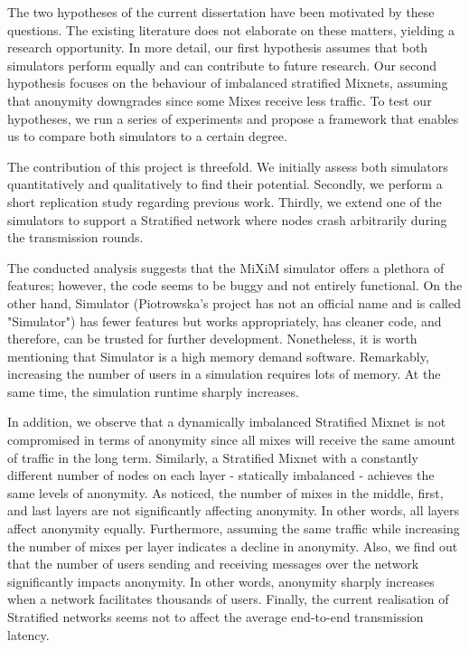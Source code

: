 \documentclass[logo,msc,cyber]{infthesis}   %
\begin{document}
The two hypotheses of the current dissertation have been motivated by these
questions. The existing literature does not elaborate on these matters, yielding
a research opportunity. In more detail, our first hypothesis assumes that both
simulators perform equally and can contribute to future research. Our second
hypothesis focuses on the behaviour of imbalanced stratified Mixnets, assuming
that anonymity downgrades since some Mixes receive less traffic. To test our
hypotheses, we run a series of experiments and propose a framework that enables
us to compare both simulators to a certain degree.

The contribution of this project is threefold. We initially assess both
simulators quantitatively and qualitatively to find their potential. Secondly,
we perform a short replication study regarding previous work. Thirdly, we extend
one of the simulators to support a Stratified network where nodes crash
arbitrarily during the transmission rounds.

The conducted analysis suggests that the MiXiM\cite{mixim} simulator offers a
plethora of features; however, the code seems to be buggy and not entirely
functional. On the other hand, Simulator\cite{simulator} (Piotrowska's project
has not an official name and is called "Simulator") has fewer features but works
appropriately, has cleaner code, and therefore, can be trusted for further
development. Nonetheless, it is worth mentioning that Simulator is a high memory
demand software. Remarkably, increasing the number of users in a simulation
requires lots of memory. At the same time, the simulation runtime sharply
increases.

In addition, we observe that a dynamically imbalanced Stratified Mixnet is not
compromised in terms of anonymity since all mixes will receive the same amount
of traffic in the long term. Similarly, a Stratified Mixnet with a constantly
different number of nodes on each layer - statically imbalanced - achieves the
same levels of anonymity. As noticed, the number of mixes in the middle, first,
and last layers are not significantly affecting anonymity. In other words, all
layers affect anonymity equally. Furthermore, assuming the same traffic while
increasing the number of mixes per layer indicates a decline in anonymity. Also,
we find out that the number of users sending and receiving messages over the
network significantly impacts anonymity. In other words, anonymity sharply
increases when a network facilitates thousands of users. Finally, the current
realisation of Stratified networks seems not to affect the average end-to-end
transmission latency.
\end{document}
